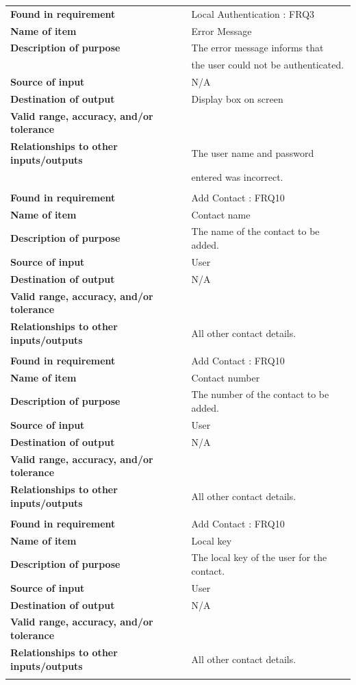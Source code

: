 \newpage
\begin{tabular}{ll}
\textbf{Found in requirement}&Local Authentication : FRQ3\\
\textbf{Name of item}&Error Message\\
\textbf{Description of purpose}&The error message informs that \\&the user could not be authenticated.\\
\textbf{Source of input}&N/A\\
\textbf{Destination of output}&Display box on screen\\
\textbf{Valid range, accuracy, and/or tolerance}&\\
\textbf{Relationships to other inputs/outputs}&The user name and password \\& entered was incorrect.\\
&\\
\textbf{Found in requirement}&Add Contact : FRQ10\\
\textbf{Name of item}&Contact name\\
\textbf{Description of purpose}&The name of the contact to be added.\\
\textbf{Source of input}&User\\
\textbf{Destination of output}&N/A\\
\textbf{Valid range, accuracy, and/or tolerance}&\\
\textbf{Relationships to other inputs/outputs}&All other contact details.\\
&\\
\textbf{Found in requirement}&Add Contact : FRQ10\\
\textbf{Name of item}&Contact number\\
\textbf{Description of purpose}&The number of the contact to be added.\\
\textbf{Source of input}&User\\
\textbf{Destination of output}&N/A\\
\textbf{Valid range, accuracy, and/or tolerance}&\\
\textbf{Relationships to other inputs/outputs}&All other contact details.\\
&\\
\textbf{Found in requirement}&Add Contact : FRQ10\\
\textbf{Name of item}&Local key\\
\textbf{Description of purpose}&The local key of the user for the contact.\\
\textbf{Source of input}&User\\
\textbf{Destination of output}&N/A\\
\textbf{Valid range, accuracy, and/or tolerance}&\\
\textbf{Relationships to other inputs/outputs}&All other contact details.\\
&\\
\end{tabular}
